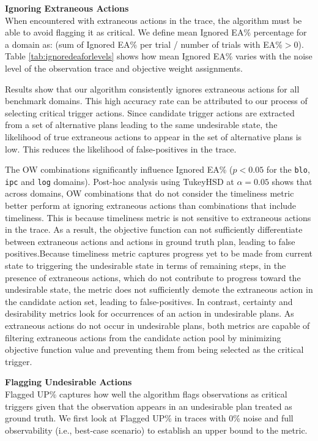 \textbf{Ignoring Extraneous Actions}\\
When encountered with extraneous actions in the trace, the algorithm must be able to avoid flagging it as critical. We define mean Ignored EA\% percentage for a domain as: (sum of Ignored EA\% per trial / number of trials with EA\%$>$0). Table \ref{tab:ignoredeaforlevels} shows how mean Ignored EA\% varies with the noise level of the observation trace and objective weight assignments.

Results show that our algorithm consistently ignores extraneous actions for all benchmark domains. This high accuracy rate can be attributed to our process of selecting critical trigger actions. Since candidate trigger actions are extracted from a set of alternative plans leading to the same undesirable state, the likelihood of true extraneous actions to appear in the set of alternative plans is low. This reduces the likelihood of false-positives in the trace.


The OW combinations significantly influence Ignored EA\%  ($p<0.05$ for the \texttt{blo}, \texttt{ipc} and \texttt{log} domains). Post-hoc analysis using TukeyHSD at $\alpha=0.05$ shows that across domains, OW combinations that do not consider the timeliness metric better perform at ignoring extraneous actions than combinations that include timeliness. This is because timeliness metric is not sensitive to extraneous actions in the trace. As a result, the objective function can not sufficiently differentiate between extraneous actions and actions in ground truth plan, leading to false positives.Because timeliness metric captures progress yet to be made from current state to triggering the undesirable state in terms of remaining steps, in the presence of extraneous actions, which do not contribute to progress toward the undesirable state, the metric does not sufficiently demote the extraneous action in the candidate action set, leading to false-positives. 
In contrast, certainty and desirability metrics look for occurrences of an action in undesirable plans. As extraneous actions do not occur in undesirable plans, both metrics are capable of filtering extraneous actions from the candidate action pool by minimizing objective function value and preventing them from being selected as the critical trigger.


\textbf{Flagging Undesirable Actions}\\
Flagged UP\% captures how well the algorithm flags observations as critical triggers given that the observation appears in an undesirable plan treated as ground truth. We first look at Flagged UP\% in traces with 0\% noise and full observability (i.e., best-case scenario) to establish an upper bound to the metric.

